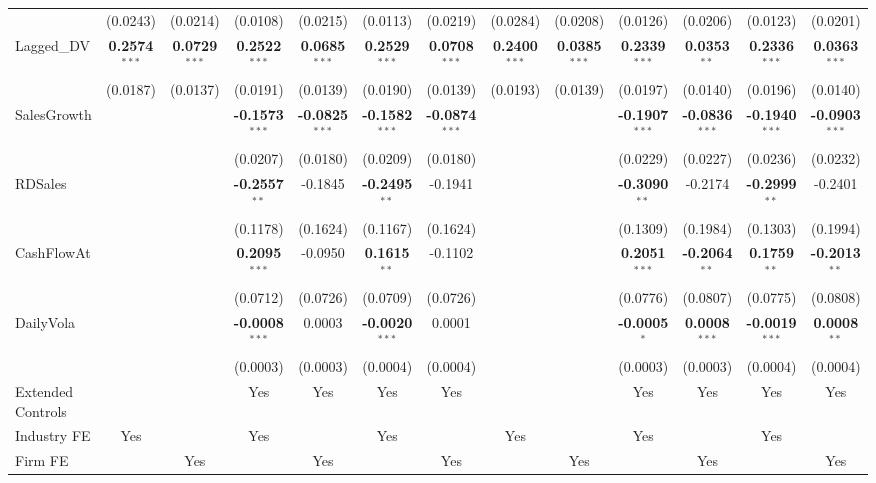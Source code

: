 \begin{landscape}
\begin{table}[H]
\begin{tabular}{lcccccccccccc}
 & (0.0243) & (0.0214) & (0.0108) & (0.0215) & (0.0113) & (0.0219) & (0.0284) & (0.0208) & (0.0126) & (0.0206) & (0.0123) & (0.0201) \\
Lagged\_DV & \textbf{0.2574}$^{***}$ & \textbf{0.0729}$^{***}$ & \textbf{0.2522}$^{***}$ & \textbf{0.0685}$^{***}$ & \textbf{0.2529}$^{***}$ & \textbf{0.0708}$^{***}$ & \textbf{0.2400}$^{***}$ & \textbf{0.0385}$^{***}$ & \textbf{0.2339}$^{***}$ & \textbf{0.0353}$^{**}$ & \textbf{0.2336}$^{***}$ & \textbf{0.0363}$^{***}$ \\
 & (0.0187) & (0.0137) & (0.0191) & (0.0139) & (0.0190) & (0.0139) & (0.0193) & (0.0139) & (0.0197) & (0.0140) & (0.0196) & (0.0140) \\
SalesGrowth &  &  & \textbf{-0.1573}$^{***}$ & \textbf{-0.0825}$^{***}$ & \textbf{-0.1582}$^{***}$ & \textbf{-0.0874}$^{***}$ &  &  & \textbf{-0.1907}$^{***}$ & \textbf{-0.0836}$^{***}$ & \textbf{-0.1940}$^{***}$ & \textbf{-0.0903}$^{***}$ \\
 &  &  & (0.0207) & (0.0180) & (0.0209) & (0.0180) &  &  & (0.0229) & (0.0227) & (0.0236) & (0.0232) \\
RDSales &  &  & \textbf{-0.2557}$^{**}$ & -0.1845 & \textbf{-0.2495}$^{**}$ & -0.1941 &  &  & \textbf{-0.3090}$^{**}$ & -0.2174 & \textbf{-0.2999}$^{**}$ & -0.2401 \\
 &  &  & (0.1178) & (0.1624) & (0.1167) & (0.1624) &  &  & (0.1309) & (0.1984) & (0.1303) & (0.1994) \\
CashFlowAt &  &  & \textbf{0.2095}$^{***}$ & -0.0950 & \textbf{0.1615}$^{**}$ & -0.1102 &  &  & \textbf{0.2051}$^{***}$ & \textbf{-0.2064}$^{**}$ & \textbf{0.1759}$^{**}$ & \textbf{-0.2013}$^{**}$ \\
 &  &  & (0.0712) & (0.0726) & (0.0709) & (0.0726) &  &  & (0.0776) & (0.0807) & (0.0775) & (0.0808) \\
DailyVola &  &  & \textbf{-0.0008}$^{***}$ & 0.0003 & \textbf{-0.0020}$^{***}$ & 0.0001 &  &  & \textbf{-0.0005}$^{*}$ & \textbf{0.0008}$^{***}$ & \textbf{-0.0019}$^{***}$ & \textbf{0.0008}$^{**}$ \\
 &  &  & (0.0003) & (0.0003) & (0.0004) & (0.0004) &  &  & (0.0003) & (0.0003) & (0.0004) & (0.0004) \\
\midrule
Extended Controls &  &  & Yes & Yes & Yes & Yes &  &  & Yes & Yes & Yes & Yes \\
Industry FE & Yes &  & Yes &  & Yes &  & Yes &  & Yes &  & Yes &  \\
Firm FE &  & Yes &  & Yes &  & Yes &  & Yes &  & Yes &  & Yes \\

\end{tabular}
\end{table}
\end{landscape}
